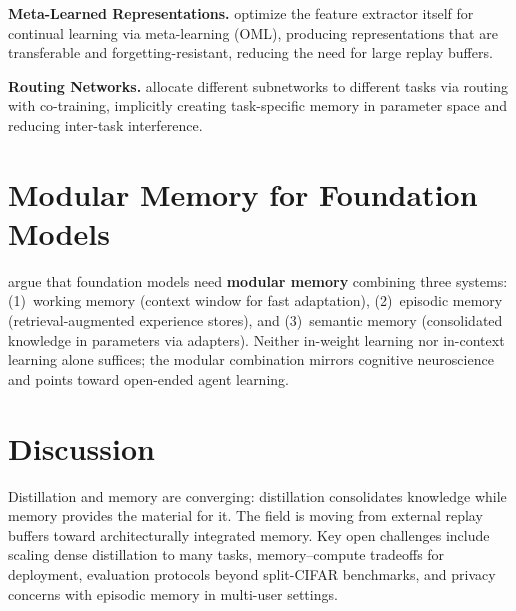\documentclass[11pt]{article}
\begin{document}
\textbf{Meta-Learned Representations.}
\citet{javed2019meta} optimize the feature extractor itself for continual learning via meta-learning (OML), producing representations that are transferable and forgetting-resistant, reducing the need for large replay buffers.

\textbf{Routing Networks.}
\citet{collier2020routing} allocate different subnetworks to different tasks via routing with co-training, implicitly creating task-specific memory in parameter space and reducing inter-task interference.

\section{Modular Memory for Foundation Models}

\citet{dorovatas2026modular} argue that foundation models need \textbf{modular memory} combining three systems: (1)~working memory (context window for fast adaptation), (2)~episodic memory (retrieval-augmented experience stores), and (3)~semantic memory (consolidated knowledge in parameters via adapters). Neither in-weight learning nor in-context learning alone suffices; the modular combination mirrors cognitive neuroscience and points toward open-ended agent learning.

\section{Discussion}

Distillation and memory are converging: distillation consolidates knowledge while memory provides the material for it. The field is moving from external replay buffers toward architecturally integrated memory. Key open challenges include scaling dense distillation to many tasks, memory--compute tradeoffs for deployment, evaluation protocols beyond split-CIFAR benchmarks, and privacy concerns with episodic memory in multi-user settings.
\end{document}
